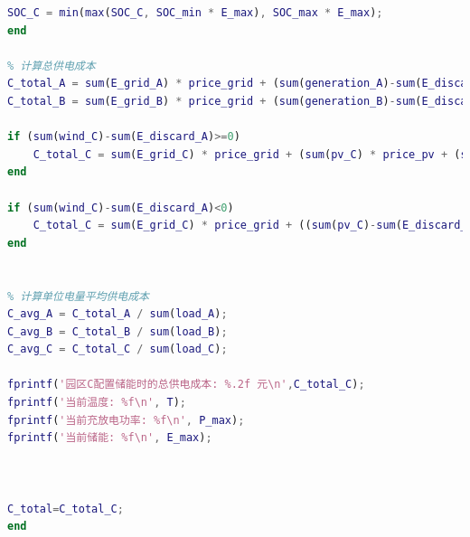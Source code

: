 \documentclass{cumcmthesis}
\begin{document}
\begin{appendices}
\begin{lstlisting}[language=Matlab]
    SOC_C = min(max(SOC_C, SOC_min * E_max), SOC_max * E_max);
end

% 计算总供电成本
C_total_A = sum(E_grid_A) * price_grid + (sum(generation_A)-sum(E_discard_A)) * price_pv + C_day;
C_total_B = sum(E_grid_B) * price_grid + (sum(generation_B)-sum(E_discard_B))* price_wind + C_day;

if (sum(wind_C)-sum(E_discard_A)>=0)
    C_total_C = sum(E_grid_C) * price_grid + (sum(pv_C) * price_pv + (sum(wind_C)-sum(E_discard_A)) * price_wind) + C_day;
end

if (sum(wind_C)-sum(E_discard_A)<0)
    C_total_C = sum(E_grid_C) * price_grid + ((sum(pv_C)-sum(E_discard_A)+sum(wind_C))* price_pv) + C_day;
end


% 计算单位电量平均供电成本
C_avg_A = C_total_A / sum(load_A);
C_avg_B = C_total_B / sum(load_B);
C_avg_C = C_total_C / sum(load_C);

fprintf('园区C配置储能时的总供电成本: %.2f 元\n',C_total_C);
fprintf('当前温度: %f\n', T);
fprintf('当前充放电功率: %f\n', P_max);
fprintf('当前储能: %f\n', E_max);



C_total=C_total_C;
end
\end{lstlisting}



\end{appendices}
\end{document}

